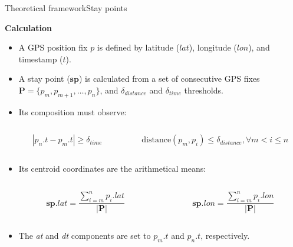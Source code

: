 \begin{frame}[noframenumbering]{Theoretical framework}{Stay points}
\begin{block}{\small \textbf{Calculation}}
\begin{itemize}
  \item A GPS position fix $p$ is defined by latitude ($lat$), longitude ($lon$), and timestamp ($t$).

  \item A stay point ($\mathbf{sp}$) is calculated from a set of consecutive GPS fixes $\mathbf{P}=\{p_{m},p_{m+1},\ldots,p_{n}\}$, and $\delta_{distance}$ and $\delta_{time}$ thresholds. 
  
  \item Its composition must observe:
  \begin{columns}
  \begin{column}{0.5\textwidth}
  \begin{equation*}
    \left|p_{n}.t-p_{m}.t\right|\geq\delta_{time}
  \end{equation*}
  \end{column}

  \begin{column}{0.5\textwidth}
  \begin{equation*}
    \text{distance}(p_{m},p_{i})\leq\delta_{distance}, \forall m<i\leq n
  \end{equation*}
  \end{column}
  \end{columns}
  
  \item Its centroid coordinates are the arithmetical means:
  \begin{columns}
  \begin{column}{0.5\textwidth}
  \begin{equation*}
  \mathbf{sp}.lat = \frac{ \sum_{i=m}^{n}p_{i}.lat }{ |\mathbf{P}| }\label{eq:centroid-latitude}
  \end{equation*}
  \end{column}

  \begin{column}{0.5\textwidth}
  \begin{equation*}
  \mathbf{sp}.lon = \frac{ \sum_{i=m}^{n}p_{i}.lon }{ |\mathbf{P}| }\label{eq:centroid-longitude}
  \end{equation*}
  \end{column}
  \end{columns}
  \item The \emph{at} and \emph{dt} components are set to $p_m.t$ and $p_n.t$, respectively.
\end{itemize}
\end{block}
\end{frame}

